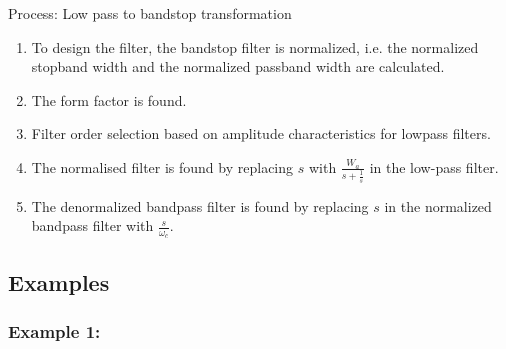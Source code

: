 Process: Low pass to bandstop transformation
\begin{enumerate}
  \item To design the filter, the bandstop filter is normalized, i.e. the normalized stopband width and the normalized passband width are calculated.
  \item The form factor is found.
  \item Filter order selection based on amplitude characteristics for lowpass filters.
  \item The normalised filter is found by replacing $s$ with $\frac{W_{a}}{s+\frac{1}{s}}$ in the low-pass filter.
  \item The denormalized bandpass filter is found by replacing $s$ in the normalized bandpass filter with $\frac{s}{\omega_{c}}$.
\end{enumerate}

\subsection{Examples}
\subsubsection{Example 1:}
